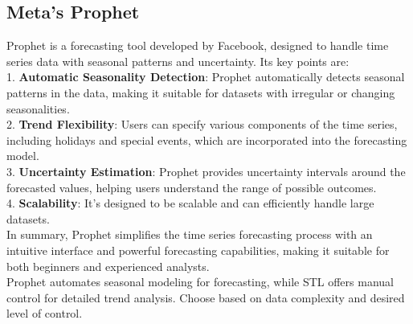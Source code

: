 \subsection{Meta's Prophet}
Prophet is a forecasting tool developed by Facebook, designed to handle time series data with seasonal patterns and uncertainty. Its key points are: \\
1. \textbf{Automatic Seasonality Detection}: Prophet automatically detects seasonal patterns in the data, making it suitable for datasets with irregular or changing seasonalities. \\
2. \textbf{Trend Flexibility}: Users can specify various components of the time series, including holidays and special events, which are incorporated into the forecasting model. \\
3. \textbf{Uncertainty Estimation}: Prophet provides uncertainty intervals around the forecasted values, helping users understand the range of possible outcomes. \\
4. \textbf{Scalability}: It's designed to be scalable and can efficiently handle large datasets. \\
In summary, Prophet simplifies the time series forecasting process with an intuitive interface and powerful forecasting capabilities, making it suitable for both beginners and experienced analysts. \\

Prophet automates seasonal modeling for forecasting, while STL offers manual control for detailed trend analysis. Choose based on data complexity and desired level of control.

